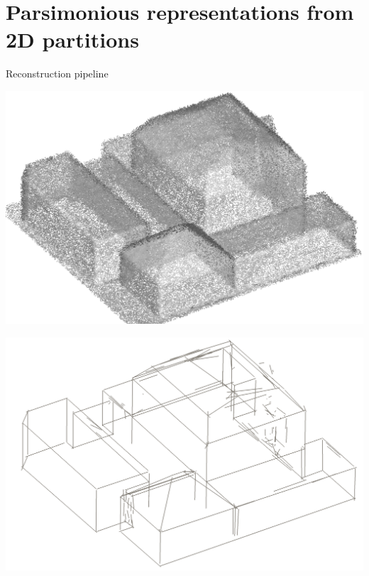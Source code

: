 \graphicspath{{images/arrangements/}}

\section{Parsimonious representations from 2D partitions}

\begin{frame}{Reconstruction pipeline}
	\begin{minipage}[b]{0.2\linewidth}
	\includegraphics[width=\linewidth]{pipeline/pointcloud_crop}
	\end{minipage}%
	\begin{minipage}[b]{0.2\linewidth}
		\includegraphics[width=\linewidth]{pipeline/segments_crop}
	\end{minipage}%
	\begin{minipage}[b]{0.2\linewidth}

\end{minipage}
\end{frame}
